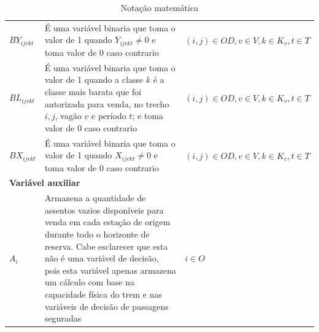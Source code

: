 \begin{table}[H]
\begin{tabular}{p{2cm} p{9.5cm} p{3.2cm}}
		$BY_{ijvkt}$       & É uma variável binaria que toma o valor de 1 quando $Y_{ijvkt} \neq 0$ e toma  valor de 0 caso contrario                                                                                                                                                                                                                                                                                                                      & $(i,j) \in OD, v \in V, k \in K_v, t \in T$ \\
		$BL_{ijvkt}$       & É uma variável binaria que toma o valor de 1 quando a classe $k$ é a classe mais barata que foi autorizada para venda, no trecho $i,j$, vagão $v$ e período $t$; e toma  valor de 0 caso contrario                                                                                                                                                                                                                                                                    & $(i,j) \in OD, v \in V, k \in K_v, t \in T$  \\
		$BX_{ijvkt}$       & É uma variável binaria que toma o valor de 1 quando $X_{ijvkt} \neq 0$ e toma  valor de 0 caso contrario                                                                                                                                                                                                                                                                                                                      & $(i,j) \in OD, v \in V, k \in K_v, t \in T$ \\
		\multicolumn{3}{l}{\textbf{Variável auxiliar}}                                                                                                                                                                                                                                                                                                                                                                                                                                                    \\ \midrule
		$A_{i}$            & Armazena a quantidade de assentos vazios disponíveis para venda em cada estação de origem durante todo o horizonte de reserva. Cabe esclarecer que esta não é uma variável de decisão, pois esta variável apenas armazena um cálculo com base na capacidade física do trem e nas variáveis de decisão de passagens seguradas                                                                                                          & $i \in O$                                    \\
		\bottomrule
	\end{tabular}
	\caption{Notação matemática}
	\label{tab: m1_definicao2}
\end{table}

